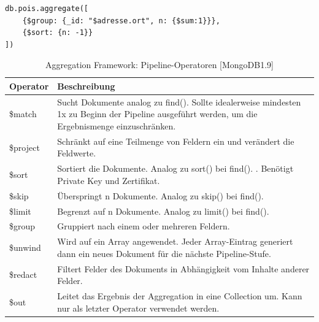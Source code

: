 \begin{lstlisting}[caption=MongoDB Aggregate, label=lst:MongoDBAggregate]
db.pois.aggregate([
    {$group: {_id: "$adresse.ort", n: {$sum:1}}},
    {$sort: {n: -1}}
])
\end{lstlisting}

\begin{table}[h]
\caption[Aggregation Framework: Pipeline-Operatoren]{Aggregation Framework: Pipeline-Operatoren [MongoDB1.9]}
\label{tab:AggregationFrameworkPipelineOperatoren}
\begin{center}
    \begin{tabular}{ l  p{12cm}}
    \toprule
    \textbf{Operator}  & \textbf{Beschreibung} \\
    \midrule
\rule{0pt}{17pt}
    \$match &Sucht Dokumente analog zu find(). Sollte idealerweise mindesten 1x zu Beginn der Pipeline ausgeführt werden, um die Ergebnismenge einzuschränken.\\
    
\rule{0pt}{17pt}
    \$project & Schränkt auf eine Teilmenge von Feldern ein und verändert die Feldwerte.  \\
    
\rule{0pt}{17pt}
	\$sort & Sortiert die Dokumente. Analog zu sort() bei find(). .\newline
	Benötigt Private Key und Zertifikat.  \\
	
\rule{0pt}{17pt}
    \$skip & Überspringt n Dokumente. Analog zu skip() bei find().  \\ 
    
\rule{0pt}{17pt}
    \$limit & Begrenzt auf n Dokumente. Analog zu limit() bei find().  \\

\rule{0pt}{17pt}
   \$group   &	Gruppiert nach einem oder mehreren Feldern. \\ 

\rule{0pt}{17pt}
	\$unwind  &	Wird auf ein Array angewendet. Jeder Array-Eintrag generiert dann ein neues Dokument für die nächste Pipeline-Stufe.\\

\rule{0pt}{17pt}
	\$redact  &	Filtert Felder des Dokuments in Abhängigkeit vom Inhalte anderer Felder.\\

\rule{0pt}{17pt}
	\$out  &	Leitet das Ergebnis der Aggregation in eine Collection um. Kann nur als letzter Operator verwendet werden.  \\
    \bottomrule
    \end{tabular}
\end{center}
\end{table}



